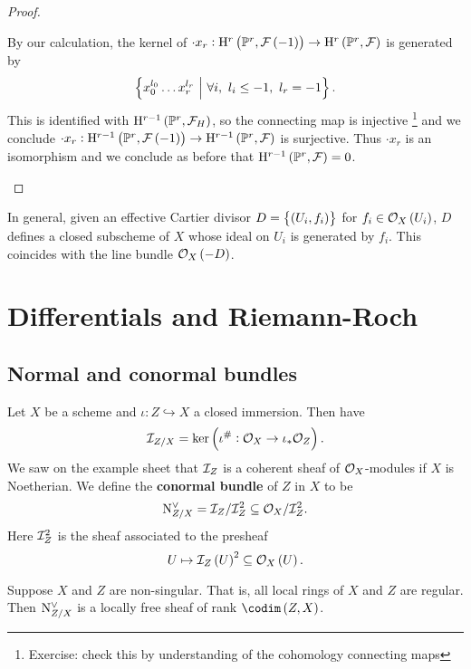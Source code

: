 \begin{proof}
\begin{itemize}
\begin{itemize}
$$$$
By our calculation, the kernel of $ \cdot x_r : \H^r\br{\PP^r, \FFF\br{-1}} \to \H^r\br{\PP^r, \FFF} $ is generated by
$$ \cbr{x_0^{l_0} \dots x_r^{l_r} \st \forall i, \ l_i \le -1, \ l_r = -1}. $$
This is identified with $ \H^{r - 1}\br{\PP^r, \FFF_H} $, so the connecting map is injective \footnote{Exercise: check this by understanding of the \Cech cohomology connecting maps} and we conclude $ \cdot x_r : \H^{r - 1}\br{\PP^r, \FFF\br{-1}} \to \H^{r - 1}\br{\PP^r, \FFF} $ is surjective. Thus $ \cdot x_r $ is an isomorphism and we conclude as before that $ \H^{r - 1}\br{\PP^r, \FFF} = 0 $.
\end{itemize}
\end{itemize}
\end{proof}

\begin{remark*}
In general, given an effective Cartier divisor $ D = \cbr{\br{U_i, f_i}} $ for $ f_i \in \OOO_X\br{U_i} $, $ D $ defines a closed subscheme of $ X $ whose ideal on $ U_i $ is generated by $ f_i $. This coincides with the line bundle $ \OOO_X\br{-D} $.
\end{remark*}

\pagebreak

\section{Differentials and Riemann-Roch}

\subsection{Normal and conormal bundles}

Let $ X $ be a scheme and $ \iota : Z \hookrightarrow X $ a closed immersion. Then have
$$ \III_{Z / X} = \ker \br{\iota^\# : \OOO_X \to \iota_*\OOO_Z}. $$
We saw on the example sheet that $ \mathcal{I}_Z $ is a coherent sheaf of $ \mathcal{O}_X $-modules if $ X $ is Noetherian. We define the \textbf{conormal bundle} of $ Z $ in $ X $ to be
$$ \mathrm{N}_{Z / X}^\vee = \mathcal{I}_Z / \mathcal{I}_Z^2 \subseteq \mathcal{O}_X / \mathcal{I}_Z^2. $$
Here $ \mathcal{I}_Z^2 $ is the sheaf associated to the presheaf
$$ U \mapsto \III_Z\br{U}^2 \subseteq \OOO_X\br{U}. $$

\begin{fact*}
Suppose $ X $ and $ Z $ are non-singular. That is, all local rings of $ X $ and $ Z $ are regular. Then $ \mathrm{N}_{Z / X}^\vee $ is a locally free sheaf of rank $ \codim\br{Z, X} $.
\end{fact*}


